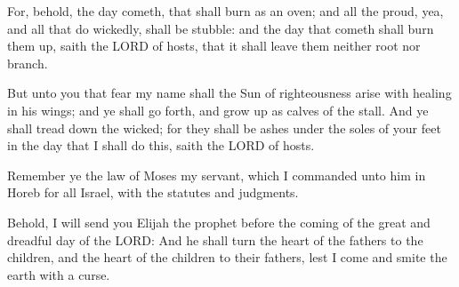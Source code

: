  For, behold, the day cometh, that shall burn as an oven;
and all the proud, yea, and all that do wickedly, shall be stubble: and
the day that cometh shall burn them up, saith the LORD of hosts, that it
shall leave them neither root nor branch.

 But unto you that fear my name shall the Sun of
righteousness arise with healing in his wings; and ye shall go forth,
and grow up as calves of the stall.  And ye shall tread down
the wicked; for they shall be ashes under the soles of your feet in the
day that I shall do this, saith the LORD of hosts.

 Remember ye the law of Moses my servant, which I
commanded unto him in Horeb for all Israel, with the statutes and
judgments.

 Behold, I will send you Elijah the prophet before the
coming of the great and dreadful day of the LORD:  And he
shall turn the heart of the fathers to the children, and the heart of
the children to their fathers, lest I come and smite the earth with a
curse.
